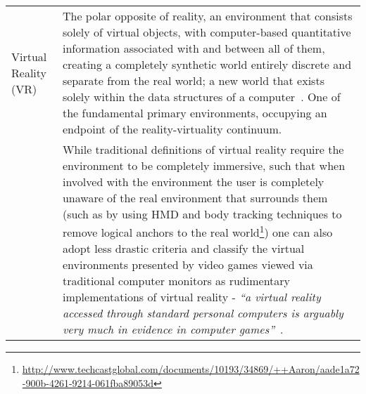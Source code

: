 \begin{center}
\begin{longtable}{ l p{10cm} }
\midrule





Virtual Reality (VR) & The polar opposite of reality, an environment that consists solely of virtual objects, with computer-based quantitative information associated with and between all of them, creating a completely synthetic world entirely discrete and separate from the real world; a new world that exists solely within the data structures of a computer~\cite{Milgram1999, Want2009}. One of the fundamental primary environments, occupying an endpoint of the reality-virtuality continuum. \\

& While traditional definitions of virtual reality require the environment to be completely immersive, such that when involved with the environment the user is completely unaware of the real environment that surrounds them (such as by using HMD and body tracking techniques to remove logical anchors to the real world\footnote{\url{http://www.techcastglobal.com/documents/10193/34869/++Aaron/aade1a72-900b-4261-9214-061fba89053d}}) one can also adopt less drastic criteria and classify the virtual environments presented by video games viewed via traditional computer monitors as rudimentary implementations of virtual reality - \textit{``a virtual reality accessed through standard personal computers is arguably very much in evidence in computer games''}~\cite{Green2014}. \\
		
\midrule



		

\end{longtable}
\end{center}
